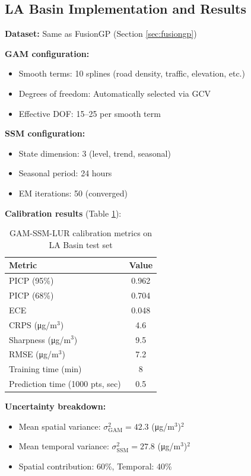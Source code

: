 \documentclass[11pt,letterpaper]{article}
\begin{document}
\subsection{LA Basin Implementation and Results}

\textbf{Dataset:} Same as FusionGP (Section \ref{sec:fusiongp})

\textbf{GAM configuration:}
\begin{itemize}
    \item Smooth terms: 10 splines (road density, traffic, elevation, etc.)
    \item Degrees of freedom: Automatically selected via GCV
    \item Effective DOF: 15--25 per smooth term
\end{itemize}

\textbf{SSM configuration:}
\begin{itemize}
    \item State dimension: 3 (level, trend, seasonal)
    \item Seasonal period: 24 hours
    \item EM iterations: 50 (converged)
\end{itemize}

\textbf{Calibration results} (Table \ref{tab:gamssm_results}):

\begin{table}[h]
\centering
\caption{GAM-SSM-LUR calibration metrics on LA Basin test set}
\label{tab:gamssm_results}
\begin{tabular}{@{}lc@{}}
\toprule
\textbf{Metric} & \textbf{Value} \\
\midrule
PICP (95\%) & 0.962 \\
PICP (68\%) & 0.704 \\
ECE & 0.048 \\
CRPS (μg/m$^3$) & 4.6 \\
Sharpness (μg/m$^3$) & 9.5 \\
RMSE (μg/m$^3$) & 7.2 \\
Training time (min) & 8 \\
Prediction time (1000 pts, sec) & 0.5 \\
\bottomrule
\end{tabular}
\end{table}

\textbf{Uncertainty breakdown:}
\begin{itemize}
    \item Mean spatial variance: $\sigma^2_{\text{GAM}} = 42.3$ (μg/m$^3$)$^2$
    \item Mean temporal variance: $\sigma^2_{\text{SSM}} = 27.8$ (μg/m$^3$)$^2$
    \item Spatial contribution: 60\%, Temporal: 40\%
\end{itemize}
\end{document}
